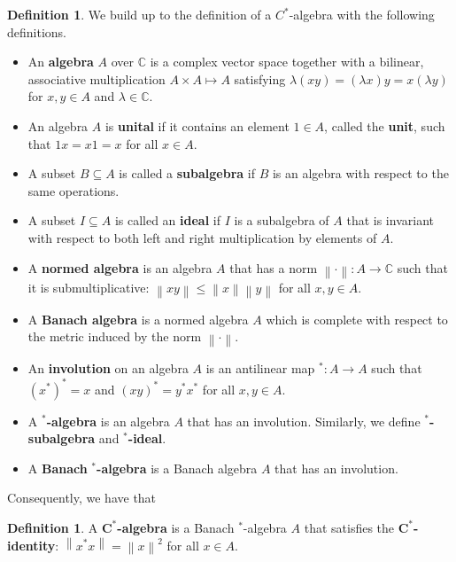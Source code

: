 \documentclass{article}
\theoremstyle{plain}
\theoremstyle{definition}
\newtheorem{definition}[theorem]{Definition}
\theoremstyle{remark}
\newcommand{\norm}[1]{\left\lVert#1\right\rVert}
\begin{document}
\begin{definition}
	We build up to the definition of a $C^{*}$-algebra with the following definitions.
	\begin{itemize}
		\item An \textbf{algebra} $A$ over $\mathbb{C}$ is a complex vector space
			together with a bilinear, associative multiplication
			$A \times A \mapsto A$ 
			satisfying 
			$\lambda(xy) = (\lambda{x})y = x(\lambda{y})$
			for $x, y \in A$ and $\lambda \in \mathbb{C}$.
		\item An algebra $A$ is \textbf{unital} if it contains an element $1 \in A$, called the \textbf{unit}, such that $1x = x1 = x$ for all $x \in A$.
		\item A subset $B \subseteq A$ is called a \textbf{subalgebra}
			if $B$ is an algebra with respect to the same operations.
		\item A subset $I \subseteq A$ is called an \textbf{ideal} 
			if $I$ is a subalgebra of $A$ that is invariant with respect
			to both left and right multiplication by elements of $A$.
		\item A \textbf{normed algebra} is an algebra $A$ that has a norm 
			$\norm{\cdot} : A \rightarrow \mathbb{C}$
			such that it is submultiplicative: 
			$\norm{xy} \leq \norm{x}\norm{y}$ for all $x, y \in A$.
		\item A \textbf{Banach algebra} is a normed algebra $A$ which is complete 
			with respect to the metric induced by the norm $\norm{\cdot}$.
		\item An \textbf{involution} on an algebra $A$ is an antilinear map
			$^*: A \rightarrow A$ such that $(x^*)^* = x$ and $(xy)^* = y^*x^*$ for all $x, y \in A$.
		\item A $\bm{^*}$\textbf{-algebra} is an algebra $A$ that has an involution. Similarly, we define $\bm{^*}$\textbf{-subalgebra} and $\bm{^*}$\textbf{-ideal}.
		\item A \textbf{Banach} $\bm{^*}$\textbf{-algebra} is a Banach algebra $A$ that has an involution.
	\end{itemize}
\end{definition}

Consequently, we have that

\begin{definition}
	A $\bm{C^{*}}$\textbf{-algebra} is a Banach $^*$-algebra $A$ 
	that satisfies the $\bm{C^{*}}$\textbf{-identity}: 
	$\norm{x^*x} = \norm{x}^2$ for all $x \in A$.
\end{definition}
\end{document}
